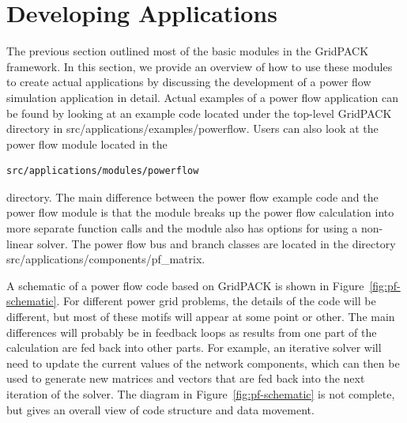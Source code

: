 \chapter{Developing Applications}

The previous section outlined most of the basic modules in the GridPACK framework. In this section, we provide an overview of how to use these modules to create actual applications by discussing the development of a power flow simulation application in detail. Actual examples of a power flow application can be found by looking at an example code located under the top-level GridPACK directory in src/applications/examples/powerflow. Users can also look at the power flow module located in the 

{
\color{red}
\begin{Verbatim}[fontseries=b]
src/applications/modules/powerflow 
\end{Verbatim}
}

directory. The main difference between the power flow example code and the power flow module is that the module breaks up the power flow calculation into more separate function calls and the module also has options for using a non-linear solver. The power flow bus and branch classes are located in the directory src/applications/components/pf\_matrix.

A schematic of a power flow code based on GridPACK is shown in
Figure~\ref{fig:pf-schematic}. For
different power grid problems, the details of the code will be different, but
most of these motifs will appear at some point or other. The main differences
will probably be in feedback loops as results from one part of the calculation
are fed back into other parts. For example, an iterative solver will need to
update the current values of the network components, which can then be used to
generate new matrices and vectors that are fed back into the next iteration of
the solver. The diagram in Figure~\ref{fig:pf-schematic} is not complete, but gives an overall view of code structure and data movement.

